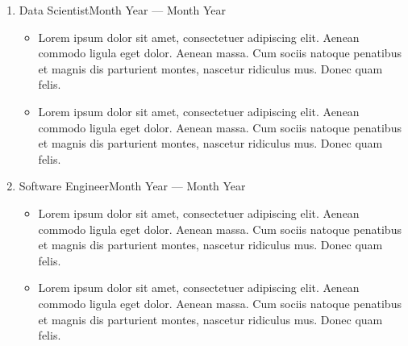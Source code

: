 \begin{enumerate}[rightmargin=0.5cm]
 \item[]
 {{Data Scientist}}{Month Year --- Month Year}
 \begin{itemize}
  \item[\bcdot]{Lorem ipsum dolor sit amet, consectetuer adipiscing elit. Aenean commodo ligula eget dolor. Aenean massa. Cum sociis natoque penatibus et magnis dis parturient montes, nascetur ridiculus mus. Donec quam felis.}
  \item[\bcdot]{Lorem ipsum dolor sit amet, consectetuer adipiscing elit. Aenean commodo ligula eget dolor. Aenean massa. Cum sociis natoque penatibus et magnis dis parturient montes, nascetur ridiculus mus. Donec quam felis.}
  \end{itemize}
  \item[]
  {{Software Engineer}}{Month Year --- Month Year}
  \begin{itemize}
   \item[\bcdot]{Lorem ipsum dolor sit amet, consectetuer adipiscing elit. Aenean commodo ligula eget dolor. Aenean massa. Cum sociis natoque penatibus et magnis dis parturient montes, nascetur ridiculus mus. Donec quam felis.}
   \item[\bcdot]{Lorem ipsum dolor sit amet, consectetuer adipiscing elit. Aenean commodo ligula eget dolor. Aenean massa. Cum sociis natoque penatibus et magnis dis parturient montes, nascetur ridiculus mus. Donec quam felis.}
   \end{itemize}

\end{enumerate}